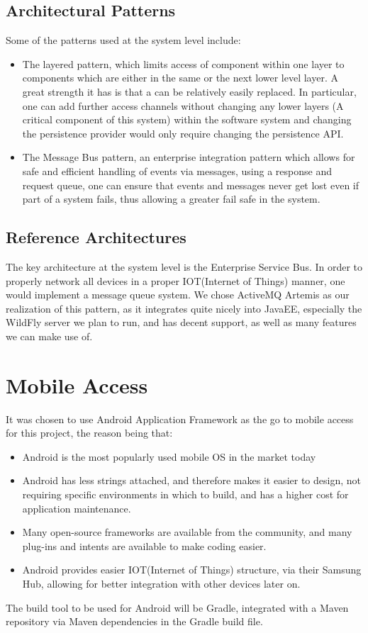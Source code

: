 \documentclass[11pt,a4paper]{article}
\begin{document}
\subsection{Architectural Patterns}
Some of the patterns used at the system level include:
\begin{itemize}
	\item The layered pattern, which limits access of component within one layer to components which are either in the same or the next lower level layer. A great strength it has is that a can be relatively easily replaced. In particular, one can add further access channels without changing any lower layers (A critical component of this system) within the software system and changing the persistence provider would only require changing the persistence API.
	\item The Message Bus pattern, an enterprise integration pattern which allows for safe and efficient handling of events via messages, using a response and request queue, one can ensure that events and messages never get lost even if part of a system fails, thus allowing a greater fail safe in the system.
\end{itemize}
\subsection{Reference Architectures}
The key architecture at the system level is the Enterprise Service Bus. In order to properly network all devices in a proper IOT(Internet of Things) manner, one would implement a message queue system. We chose ActiveMQ Artemis as our realization of this pattern, as it integrates quite nicely into JavaEE, especially the WildFly server we plan to run, and has decent support, as well as many features we can make use of.

\pagebreak

\section{Mobile Access}
It was chosen to use Android Application Framework as the go to mobile access for this project, the reason being that:
\begin{itemize}
	\item Android is the most popularly used mobile OS in the market today
	\item Android has less strings attached, and therefore makes it easier to design, not requiring specific environments in which to build, and has a higher cost for application maintenance.
	\item Many open-source frameworks are available from the community, and many plug-ins and intents are available to make coding easier.
	\item Android provides easier IOT(Internet of Things) structure, via their Samsung Hub, allowing for better integration with other devices later on.\\
\end{itemize}
The build tool to be used for Android will be Gradle, integrated with a Maven repository via Maven dependencies in the Gradle build file.
\end{document}
